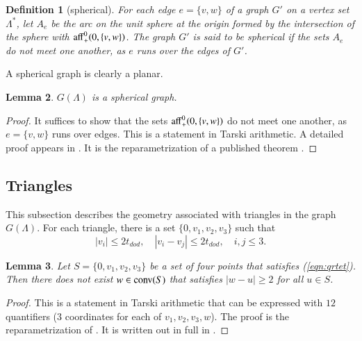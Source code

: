 \documentclass{article} %
\newtheorem{lemma}{Lemma}[subsection]
\newtheorem{definition}[lemma]{Definition}
\begin{document}
\begin{definition}[spherical]
For each edge $e=\{v,w\}$ of a graph $G'$ on a vertex set $\Lambda^*$, 
let $A_e$ be the
arc on the unit sphere at the origin formed by the intersection of the
sphere with ${\operatorname{aff}}^0_+(0,\{v,w\})$. The graph $G'$  is said to be \emph{spherical} if the sets $A_e$ do not meet
one another, as $e$ runs over the edges of $G'$.
\end{definition}

A spherical graph is clearly a planar.

\begin{lemma}\label{lemma:planar}  
$G(\Lambda)$ is a spherical graph.
\end{lemma}

\begin{proof} 
  It suffices to show that the sets
  ${\operatorname{aff}}^0_+(0,\{v,w\})$ do not meet one another, as $e=\{v,w\}$
  runs over edges.  This is a statement in Tarski arithmetic.
  A detailed proof appears in \cite[Lemma~3.2]{Hales:2002:Dodec}.  
  It is the reparametrization
  of a published theorem \cite[Lemma~3.10]{Hales:1997:DCG}.
\end{proof}


\subsection{Triangles}

This subsection describes the geometry associated with
triangles in the graph $G(\Lambda)$.  For each triangle,
there is a set $\{0,v_1,v_2,v_3\}$ such that
\begin{equation}\label{eqn:qrtet}
  |v_i| \le 2t_{dod},\quad |v_i-v_j | \le 2 t_{dod},\quad i,j\le 3.
\end{equation}

\begin{lemma} Let $S=\{0,v_1,v_2,v_3\}$ be a set of four points
that satisfies (\ref{eqn:qrtet}).  Then
there does not exist $w\in{\operatorname{conv}}(S)$
that satisfies $|w-u|\ge 2$ for all
$u\in S$.
\end{lemma}

\begin{proof} This is a statement in Tarski arithmetic that can be
expressed with $12$ quantifiers ($3$ coordinates for each of
$v_1,v_2,v_3,w$). The proof is the reparametrization of
\cite[Lemma~4.15]{Hales:2006:DCG}. It is written out in full in
\cite[Lemma~3.3]{Hales:2002:Dodec}.
\end{proof}
\end{document}
